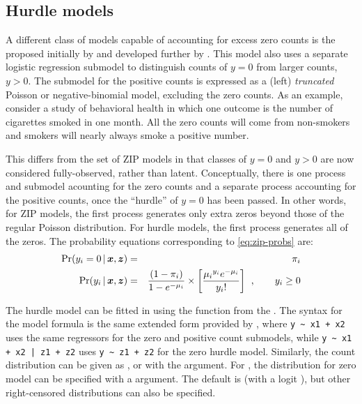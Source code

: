 \documentclass[11pt]{book}\usepackage[]{graphicx}\usepackage[]{color}
\begin{document}
\subsection{Hurdle models}\label{sec:glm-hurdle}
A different class of models capable of accounting for excess zero counts is the 
 proposed initially by \citet{Cragg:1971} and developed further by
\citet{Mullahy:1986}.
This model also uses a separate logistic regression submodel to distinguish
counts of $y=0$ from larger counts, $y>0$.
The submodel for the positive counts is expressed as a (left) \emph{truncated}
Poisson or negative-binomial model, excluding the zero counts.
As an example, consider a study of behavioral health in which one outcome is
the number of cigarettes smoked in one month.  All the zero counts will come from
non-smokers and smokers will nearly always smoke a positive number.

This differs from the set of ZIP models in that classes of $y=0$ and $y>0$
are now considered fully-observed, rather than latent.
Conceptually, there is one process and submodel acounting for the zero counts
and a separate process accounting for the positive counts, once the ``hurdle''
of $y=0$ has been passed.
In other words, for ZIP models, the first process generates 
only extra zeros beyond those of the regular Poisson distribution. 
For hurdle models, the first process generates all of the zeros.
The probability equations corresponding to \eqref{eq:zip-probs} are:
\begin{eqnarray}
\Pr ({y_i} = 0 \, | \, \bm{x}, \bm{z}) &=& {\pi _i} \\
\Pr ({y_i} \, | \, \bm{x}, \bm{z}) &=& \frac{(1 - {\pi _i})}{1-e^{-\mu_i}} 
\times \left[\frac{{{\mu _i}^{{y_i}}{e^{ - {\mu _i}}}}}{{{y_i}!}} \right] \:\: , \quad\quad y_i \ge 0 \nonumber
\end{eqnarray}

The hurdle model can be fitted in \R using the  function from the .
The syntax for the model formula is the same extended form provided by ,
where \verb|y ~ x1 + x2| uses the same regressors for the zero and positive count submodels,
while \verb#y ~ x1 + x2 | z1 + z2# uses \verb|y ~ z1 + z2| for the zero hurdle model.
Similarly, the count distribution can be given 
as 
,  or 
with the  argument.  For , the distribution for zero model
can be specified with a  argument. The default is 
(with a logit ), but other right-censored
distributions can also be specified.
\end{document}
